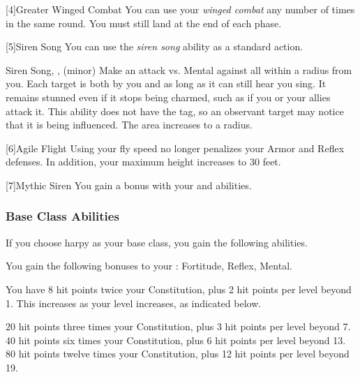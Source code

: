             [4]{Greater Winged Combat} You can use your \textit{winged combat} any number of times in the same round.
            You must still land at the end of each phase.

            [5]{Siren Song} You can use the \textit{siren song} ability as a standard action.
            \begin{magicalsustainability}{Siren Song}{, ,  (minor)}
                \rankline
                Make an attack vs. Mental against all  within a \medarea radius from you.
                \hit Each target is both \charmed by you and \stunned as long as it can still hear you sing.
                It remains stunned even if it stops being charmed, such as if you or your allies attack it.
                This ability does not have the  tag, so an observant target may notice that it is being influenced.
                \rankline
                 The area increases to a \largearea radius.
            \end{magicalsustainability}

            [6]{Agile Flight} Using your fly speed no longer penalizes your Armor and Reflex defenses.
            In addition, your maximum height increases to 30 feet.

            [7]{Mythic Siren} You gain a   bonus with your  and  abilities.

        \subsubsection{Base Class Abilities}
            If you choose harpy as your base class, you gain the following abilities.

            You gain the following bonuses to your :  Fortitude,  Reflex,  Mental.

                You have 8 hit points \add twice your Constitution, plus 2 hit points per level beyond 1.
                This increases as your level increases, as indicated below.
                \begin{itemize}
                     20 hit points \add three times your Constitution, plus 3 hit points per level beyond 7.
                     40 hit points \add six times your Constitution, plus 6 hit points per level beyond 13.
                     80 hit points \add twelve times your Constitution, plus 12 hit points per level beyond 19.
                \end{itemize}

